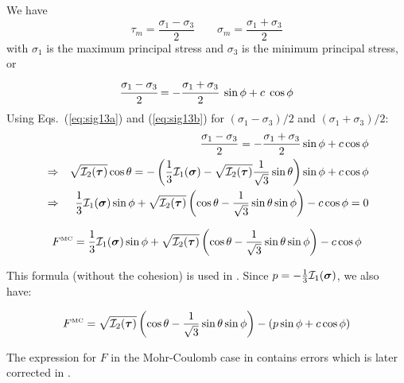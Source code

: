 We have  
\[
\tau_m=\frac{\sigma_1-\sigma_3}{2}
\qquad
\sigma_m = \frac{\sigma_1+\sigma_3}{2}
\]
with $\sigma_1$ is the maximum principal stress and $\sigma_3$ is the minimum principal stress, or
\[
\cfrac{\sigma_1-\sigma_3}{2} = 
-\cfrac{\sigma_1+\sigma_3}{2}~\sin\phi 
+c\; \cos\phi 
\]
Using Eqs.~(\ref{eq:sig13a}) and (\ref{eq:sig13b}) 
for $(\sigma_1 - \sigma_3 )/2$ and $(\sigma_1 + \sigma_3 )/2$:
\begin{eqnarray}
&& \frac{\sigma_1 - \sigma_3}{2} = -\frac{\sigma_1 + \sigma_3}{2} \sin \phi  + c \cos \phi \nonumber\\
&\Rightarrow&
\sqrt{  {\cal I}_2({\bm \tau}) } \cos \theta = -\left(\frac{1}{3}{\cal I}_1({\bm \sigma}) - \sqrt{  {\cal I}_2({\bm \tau})} \frac{1}{\sqrt{3}} \sin \theta \right) \sin \phi 
+ c \cos \phi \nonumber\\
&\Rightarrow&
\frac{1}{3} {\cal I}_1({\bm \sigma}) \sin \phi  
+ \sqrt{  {\cal I}_2({\bm \tau}) } \left( \cos \theta - \frac{1}{\sqrt{3}} \sin \theta  \sin \phi \right) - c \cos \phi = 0 \nonumber
\end{eqnarray}

\begin{mdframed}[backgroundcolor=blue!5]
\begin{equation}
F^{\text{\tiny MC}}=\frac{1}{3} {\cal I}_1({\bm \sigma}) \sin \phi  + 
\sqrt{  {\cal I}_2({\bm \tau})  } \left( \cos \theta - \frac{1}{\sqrt{3}} \sin \theta  \sin \phi \right) - c \cos \phi
\label{eq:mcF} 
\end{equation}
\end{mdframed}
This formula (without the cohesion) is used in \cite{will92}.
Since $p=-\frac{1}{3} {\cal I}_1({\bm \sigma})$, we also have:
\begin{mdframed}[backgroundcolor=blue!5]
\begin{equation}
F^{\text{\tiny MC}}=
\sqrt{  {\cal I}_2({\bm \tau})  } \left( \cos \theta - \frac{1}{\sqrt{3}} \sin \theta  \sin \phi \right) - (p \sin\phi + c \cos \phi)
\end{equation}
\end{mdframed}

\begin{remark}
The expression for $F$ in the Mohr-Coulomb case in \cite{zico74} contains errors
which is later corrected in \cite[p102]{book_zitf}. 
\end{remark}

